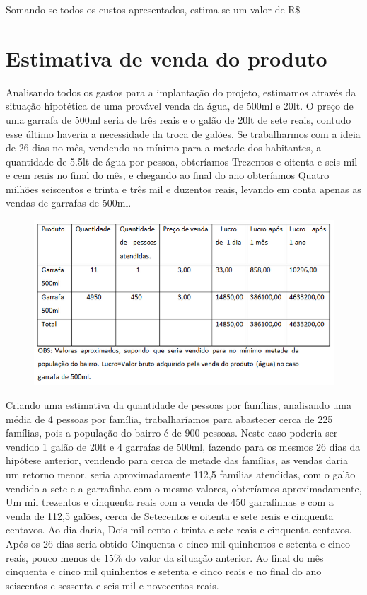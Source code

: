       Somando-se todos os custos apresentados, estima-se um valor de R\$
    
    \section{Estimativa de venda do produto}
    
      Analisando todos os gastos para a implantação do projeto, estimamos através da situação hipotética de uma provável venda da água,
      de 500ml e 20lt. O preço de uma garrafa de 500ml seria de três reais e o galão de 20lt de sete reais, contudo esse último haveria
      a necessidade da troca de galões. Se trabalharmos com a ideia de 26 dias no mês, vendendo no mínimo para a metade dos
      habitantes, a quantidade de 5.5lt de água por pessoa, obteríamos Trezentos e oitenta e seis mil e cem reais no final do
      mês, e chegando ao final do ano obteríamos Quatro milhões seiscentos e trinta e três mil e duzentos reais, levando em
      conta apenas as vendas de garrafas de 500ml.
      
      \FloatBarrier
	\begin{figure}[!h]
	    \centering
	    \includegraphics[scale = 0.6]{editaveis/figuras/estimativa_venda_1}
	    \label{estimativa_venda_1}
	\end{figure}
      \FloatBarrier
      
      Criando uma estimativa da quantidade de pessoas por famílias, analisando uma média de 4 pessoas por família, trabalharíamos
      para abastecer cerca de 225 famílias, pois a população do bairro é de 900 pessoas. Neste caso poderia ser vendido 1 galão 
      de 20lt e 4 garrafas de 500ml, fazendo para os mesmos 26 dias da hipótese anterior, vendendo para cerca de metade das
      famílias, as vendas daria um retorno menor, seria aproximadamente 112,5 famílias atendidas, com o galão vendido a sete 
      e a garrafinha com o mesmo valores, obteríamos aproximadamente, Um mil trezentos e cinquenta reais com a venda de 450
      garrafinhas e com a venda de 112,5 galões, cerca de Setecentos e oitenta e sete reais e cinquenta centavos. Ao dia daria,
      Dois mil cento e trinta e sete reais e cinquenta centavos. Após os 26 dias seria obtido Cinquenta e cinco mil quinhentos
      e setenta e cinco reais, pouco menos de 15\% do valor da situação anterior. Ao final do mês cinquenta e cinco mil 
      quinhentos e setenta e cinco reais e no final do ano seiscentos e sessenta e seis mil e novecentos reais.
      
